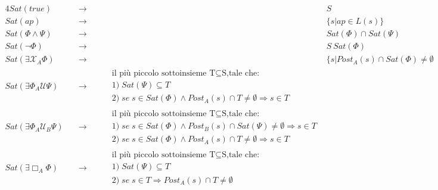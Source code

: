 \begin{alignat}{4}
Sat(true)					&\quad 	\rightarrow	\quad&&	S 	\\
Sat(ap)					&\quad	 \rightarrow	\quad&&	\lbrace s | ap \in L(s) \rbrace 	\\
Sat(\Phi \wedge \Psi)			&\quad	 \rightarrow	\quad&&	Sat(\Phi) \cap Sat(\Psi)  	\\
Sat(\neg \Phi)				&\quad	 \rightarrow	\quad&&	S \ Sat(\Phi) 	\\
Sat(\exists \mathcal{X}_A \Phi)		&\quad	 \rightarrow	\quad&&	\lbrace s | Post_A(s) \cap Sat(\Phi) \neq \emptyset 	\\
Sat(\exists \Phi_A \mathcal{U} \Psi)	&\quad	 \rightarrow	\quad&	\begin{split} & \text{il più piccolo sottoinsieme T} \subseteq \text{S,tale che:} 	\\
														& 1)\; Sat(\Psi) \subseteq T  \\
														& 2)\; se \;s \in Sat(\Phi) \wedge Post_A(s) \cap T \neq \emptyset \Rightarrow s \in T
												\end{split} \\
Sat(\exists \Phi_A \mathcal{U}_B \Psi)	&\quad	 \rightarrow	\quad&	\begin{split} & \text{il più piccolo sottoinsieme T} \subseteq \text{S,tale che:} 	\\
														& 1)\; se \; s \in Sat(\Phi) \wedge Post_B(s) \cap Sat(\Psi) \neq \emptyset \Rightarrow s \in T \\
														& 2)\; se \; s \in Sat(\Phi) \wedge Post_A(s) \cap T \neq \emptyset \Rightarrow s \in T
												\end{split} \\
Sat(\exists \Box_A \Phi)			&\quad	 \rightarrow	\quad&	\begin{split} & \text{il più piccolo sottoinsieme T} \subseteq \text{S,tale che:} 	\\
														& 1)\; Sat(\Psi) \subseteq T  \\
														& 2)\; se \; s \in T \Rightarrow Post_A(s) \cap T \neq \emptyset 
												\end{split}
\end{alignat}



